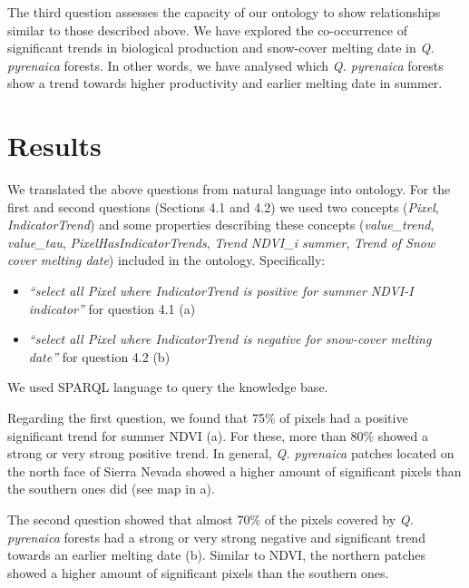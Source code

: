 The third question assesses the capacity of our ontology to show relationships similar to those described above. We have explored the co-occurrence of significant trends in biological production and snow-cover melting date in \emph{Q. pyrenaica} forests. In other words, we have analysed which \emph{Q. pyrenaica} forests show a trend towards higher productivity and earlier melting date in summer.

\section{Results}\label{sec:onto:Results}

We translated the above questions from natural language into ontology. For the first and second questions (Sections 4.1 and 4.2) we used two concepts (\emph{Pixel}, \emph{IndicatorTrend}) and some properties describing these concepts (\emph{value\_trend}, \emph{value\_tau}, \emph{PixelHasIndicatorTrends}, \emph{Trend NDVI\_i summer}, \emph{Trend of Snow cover melting date}) included in the ontology. Specifically:

\begin{itemize}
\item
  \emph{``select all Pixel where IndicatorTrend is positive for summer NDVI-I indicator''} for question 4.1 (a)
\item
  \emph{``select all Pixel where IndicatorTrend is negative for snow-cover melting date''} for question 4.2 (b)
\end{itemize}

We used SPARQL language to query the knowledge base.

Regarding the first question, we found that 75\% of pixels had a positive significant trend for summer NDVI (a). For these, more than 80\% showed a strong or very strong positive trend. In general, \emph{Q. pyrenaica} patches located on the north face of Sierra Nevada showed a higher amount of significant pixels than the southern ones did (see map in a).

The second question showed that almost 70\% of the pixels covered by \emph{Q. pyrenaica} forests had a strong or very strong negative and significant trend towards an earlier melting date (b). Similar to NDVI, the northern patches showed a higher amount of significant pixels than the southern ones.

